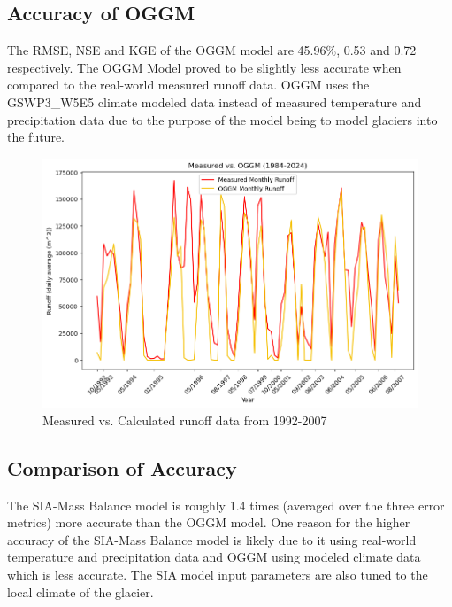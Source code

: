 \documentclass{article}
\begin{document}
\subsection{Accuracy of OGGM}
The RMSE, NSE and KGE of the OGGM model are 45.96\%, 0.53 and 0.72 respectively. The OGGM Model proved to be slightly less accurate when 
compared to the real-world measured runoff data. OGGM uses the GSWP3\_W5E5 climate modeled data instead of measured temperature and precipitation 
data due to the purpose of the model being to model glaciers into the future.
\begin{figure}[h!]
    \centering
    \includegraphics[width=\textwidth]{Plots/oggm_vs_measured.png}
    \caption{Measured vs. Calculated runoff data from 1992-2007}
    \label{fig:oggm_vs_measured}
\end{figure}
\FloatBarrier
\subsection{Comparison of Accuracy}
The SIA-Mass Balance model is roughly 1.4 times (averaged over the three error metrics) more accurate than the OGGM model. One reason for the 
higher accuracy of the SIA-Mass Balance model is likely due to it 
using real-world temperature and precipitation data and OGGM using modeled climate data which is less accurate. The SIA model input 
parameters are also tuned to the local climate of the glacier.
\end{document}
